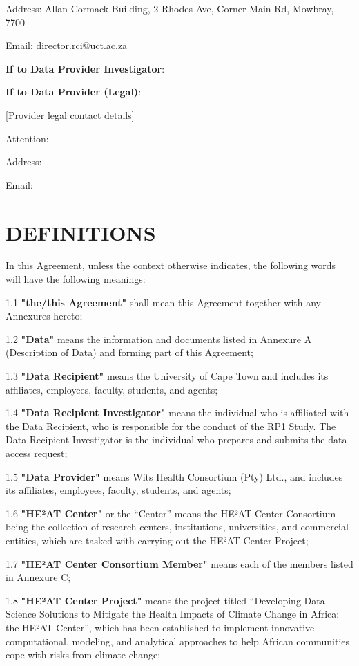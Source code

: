\documentclass[12pt,letterpaper]{article}
\begin{document}
Address: Allan Cormack Building, 2 Rhodes Ave, Corner Main Rd, Mowbray, 7700

Email: director.rci@uct.ac.za

\textbf{If to Data Provider Investigator}:

\textbf{If to Data Provider (Legal)}:

[Provider legal contact details]

Attention:

Address:

Email:

\section{DEFINITIONS}

In this Agreement, unless the context otherwise indicates, the following words will have the following meanings:

1.1 \textbf{"the/this Agreement"} shall mean this Agreement together with any Annexures hereto;

1.2 \textbf{"Data"} means the information and documents listed in Annexure A (Description of Data) and forming part of this Agreement;

1.3 \textbf{"Data Recipient"} means the University of Cape Town and includes its affiliates, employees, faculty, students, and agents;

1.4 \textbf{"Data Recipient Investigator"} means the individual who is affiliated with the Data Recipient, who is responsible for the conduct of the RP1 Study. The Data Recipient Investigator is the individual who prepares and submits the data access request;

1.5 \textbf{"Data Provider"} means Wits Health Consortium (Pty) Ltd., and includes its affiliates, employees, faculty, students, and agents;

1.6 \textbf{"HE²AT Center"} or the ``Center'' means the HE²AT Center Consortium being the collection of research centers, institutions, universities, and commercial entities, which are tasked with carrying out the HE²AT Center Project;

1.7 \textbf{"HE²AT Center Consortium Member"} means each of the members listed in Annexure C;

1.8 \textbf{"HE²AT Center Project"} means the project titled ``Developing Data Science Solutions to Mitigate the Health Impacts of Climate Change in Africa: the HE²AT Center'', which has been established to implement innovative computational, modeling, and analytical approaches to help African communities cope with risks from climate change;
\end{document}
